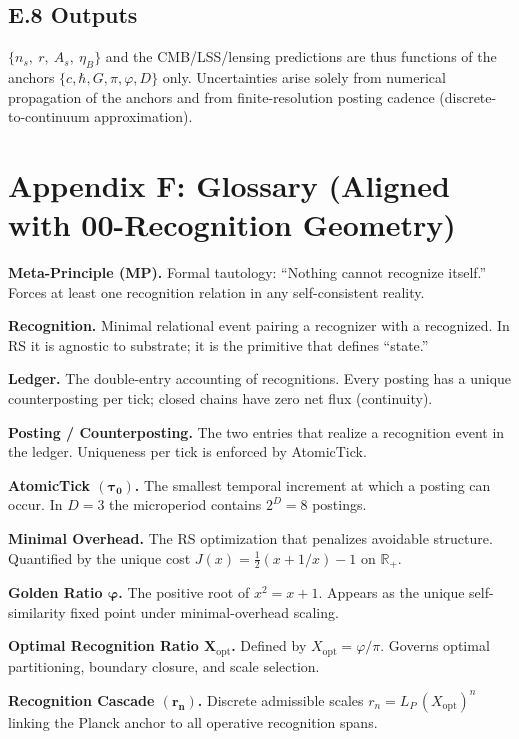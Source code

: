 \documentclass[11pt]{article}
\theoremstyle{definition}
\theoremstyle{remark}
\begin{document}
\subsection*{E.8 Outputs}

\noindent
\(\{n_s,\ r,\ A_s,\ \eta_B\}\) and the CMB/LSS/lensing predictions are thus functions of the anchors \(\{c,\hbar,G,\pi,\varphi,D\}\) only. Uncertainties arise solely from numerical propagation of the anchors and from finite-resolution posting cadence (discrete-to-continuum approximation).




\section*{Appendix F: Glossary (Aligned with 00-Recognition Geometry)}

\noindent
\textbf{Meta-Principle (MP).} Formal tautology: ``Nothing cannot recognize itself.'' Forces at least one recognition relation in any self-consistent reality.

\noindent
\textbf{Recognition.} Minimal relational event pairing a recognizer with a recognized. In RS it is agnostic to substrate; it is the primitive that defines ``state.''

\noindent
\textbf{Ledger.} The double-entry accounting of recognitions. Every posting has a unique counterposting per tick; closed chains have zero net flux (continuity).

\noindent
\textbf{Posting / Counterposting.} The two entries that realize a recognition event in the ledger. Uniqueness per tick is enforced by AtomicTick.

\noindent
\textbf{AtomicTick \(\boldsymbol{(\tau_0)}\).} The smallest temporal increment at which a posting can occur. In \(D=3\) the microperiod contains \(2^D=8\) postings.

\noindent
\textbf{Minimal Overhead.} The RS optimization that penalizes avoidable structure. Quantified by the unique cost \(J(x)=\tfrac12(x+1/x)-1\) on \(\mathbb{R}_+\).

\noindent
\textbf{Golden Ratio \(\boldsymbol{\varphi}\).} The positive root of \(x^2=x+1\). Appears as the unique self-similarity fixed point under minimal-overhead scaling.

\noindent
\textbf{Optimal Recognition Ratio \(\boldsymbol{X_{\mathrm{opt}}}\).} Defined by \(X_{\mathrm{opt}}=\varphi/\pi\). Governs optimal partitioning, boundary closure, and scale selection.

\noindent
\textbf{Recognition Cascade \(\boldsymbol{(r_n)}\).} Discrete admissible scales
\(r_n=L_P\,(X_{\mathrm{opt}})^n\) linking the Planck anchor to all operative recognition spans.
\end{document}
